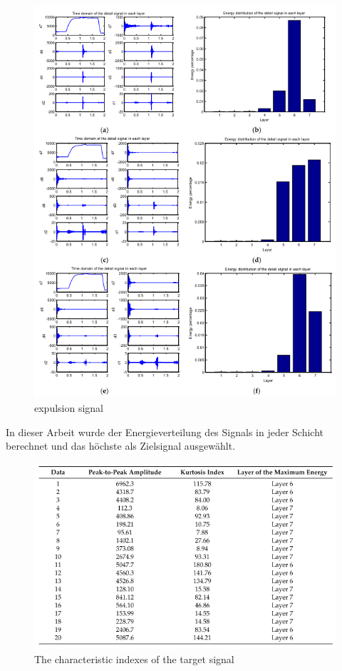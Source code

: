 \documentclass[english,ngerman]{tudscrreprt}
\begin{document}
\begin{figure}[H]
\centering
\includegraphics[scale = 0.8]{./Bilder/expulsion signal.png}
\caption{expulsion signal}\label{fgg:Wavelets}
\end{figure}
In dieser Arbeit wurde der Energieverteilung des Signals in jeder Schicht berechnet und das höchste als Zielsignal ausgewählt.
\begin{figure}[H]
\centering
\includegraphics[scale = 0.8]{./Bilder/The characteristic indexes of the target signal.png}
\caption{The characteristic indexes of the target signal}\label{fgg:Wavelets}
\end{figure}
\end{document}
